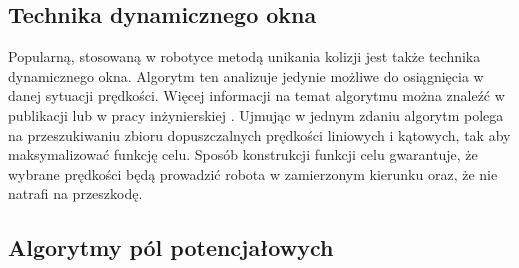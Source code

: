 	\subsection{Technika dynamicznego okna} \label{subsec:dynamic_window}
	Popularną, stosowaną w robotyce metodą unikania kolizji jest także technika dynamicznego okna. Algorytm ten analizuje jedynie możliwe do osiągnięcia w danej sytuacji prędkości.
	Więcej informacji na temat algorytmu można znaleźć w publikacji \cite{dynamic_window} lub w pracy inżynierskiej \cite{inzynierka}.
	Ujmując w jednym zdaniu algorytm polega na przeszukiwaniu zbioru dopuszczalnych prędkości liniowych i kątowych, tak aby maksymalizować funkcję celu. Sposób konstrukcji funkcji celu
	gwarantuje, że wybrane prędkości będą prowadzić robota w zamierzonym kierunku oraz, że nie natrafi na przeszkodę.
\subsection{Algorytmy pól potencjałowych}
